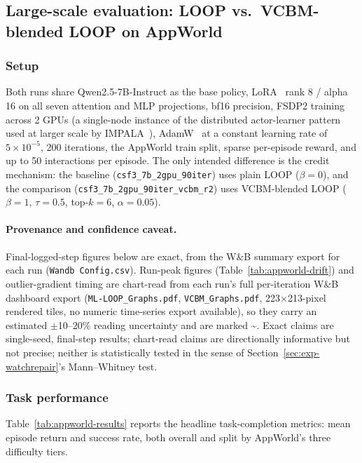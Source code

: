 \subsection{Large-scale evaluation: LOOP vs.\ VCBM-blended LOOP on AppWorld}
\label{sec:exp-appworld}

\subsubsection{Setup}
Both runs share Qwen2.5-7B-Instruct as the base policy, LoRA~\cite{hu2022lora} rank 8 / alpha 16 on all seven attention and MLP projections, bf16 precision, FSDP2 training across 2 GPUs (a single-node instance of the distributed actor-learner pattern used at larger scale by IMPALA~\cite{espeholt2018impala}), AdamW~\cite{kingma2015adam} at a constant learning rate of $5\times10^{-5}$, 200 iterations, the AppWorld train split, sparse per-episode reward, and up to 50 interactions per episode. The only intended difference is the credit mechanism: the baseline (\texttt{csf3\_7b\_2gpu\_90iter}) uses plain LOOP ($\beta=0$), and the comparison (\texttt{csf3\_7b\_2gpu\_90iter\_vcbm\_r2}) uses VCBM-blended LOOP ($\beta=1$, $\tau=0.5$, top-$k=6$, $\alpha=0.05$).

\paragraph{Provenance and confidence caveat.} Final-logged-step figures below are exact, from the W\&B summary export for each run (\texttt{Wandb Config.csv}). Run-peak figures (Table~\ref{tab:appworld-drift}) and outlier-gradient timing are chart-read from each run's full per-iteration W\&B dashboard export (\texttt{ML-LOOP\_Graphs.pdf}, \texttt{VCBM\_Graphs.pdf}, 223$\times$213-pixel rendered tiles, no numeric time-series export available), so they carry an estimated $\pm$10--20\% reading uncertainty and are marked \textasciitilde. Exact claims are single-seed, final-step results; chart-read claims are directionally informative but not precise; neither is statistically tested in the sense of Section~\ref{sec:exp-watchrepair}'s Mann--Whitney test.

\subsubsection{Task performance}
Table~\ref{tab:appworld-results} reports the headline task-completion metrics: mean episode return and success rate, both overall and split by AppWorld's three difficulty tiers.

